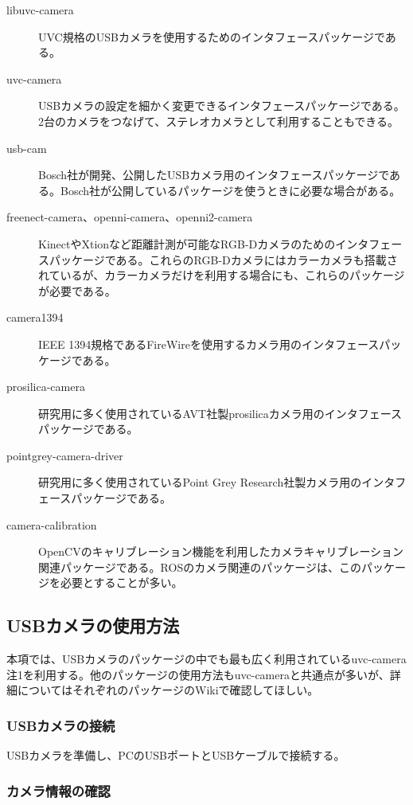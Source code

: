 \vspace{\baselineskip}
\noindent
\begin{description}
\item[libuvc-camera] UVC規格のUSBカメラを使用するためのインタフェースパッケージである。
\item[uvc-camera] USBカメラの設定を細かく変更できるインタフェースパッケージである。2台のカメラをつなげて、ステレオカメラとして利用することもできる。
\item[usb-cam] Bosch社が開発、公開したUSBカメラ用のインタフェースパッケージである。Bosch社が公開しているパッケージを使うときに必要な場合がある。
\item[freenect-camera、openni-camera、openni2-camera] KinectやXtionなど距離計測が可能なRGB-Dカメラのためのインタフェースパッケージである。これらのRGB-Dカメラにはカラーカメラも搭載されているが、カラーカメラだけを利用する場合にも、これらのパッケージが必要である。
\item[camera1394] IEEE 1394規格であるFireWireを使用するカメラ用のインタフェースパッケージである。
\item[prosilica-camera] 研究用に多く使用されているAVT社製prosilicaカメラ用のインタフェースパッケージである。
\item[pointgrey-camera-driver] 研究用に多く使用されているPoint Grey Research社製カメラ用のインタフェースパッケージである。
\item[camera-calibration] OpenCVのキャリブレーション機能を利用したカメラキャリブレーション関連パッケージである。ROSのカメラ関連のパッケージは、このパッケージを必要とすることが多い。
\end{description}

\subsection{USBカメラの使用方法}

本項では、USBカメラのパッケージの中でも最も広く利用されているuvc-camera注1を利用する。他のパッケージの使用方法もuvc-cameraと共通点が多いが、詳細についてはそれぞれのパッケージのWikiで確認してほしい。

\subsubsection{USBカメラの接続}

USBカメラを準備し、PCのUSBポートとUSBケーブルで接続する。

\subsubsection{カメラ情報の確認}

